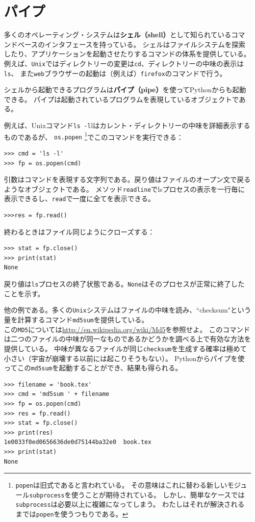 \documentclass[a4j,12pt,makeidx]{jbook}
\begin{document}
\section{パイプ}
多くのオペレーティング・システムは{\bf シェル（shell）}として知られているコマンドベースのインタフェースを持っている。
シェルはファイルシステムを探索したり、アプリケーションを起動させたりするコマンドの体系を提供している。
例えば、{\tt Unix}ではディレクトリーの変更は{\tt cd}、ディレクトリーの中味の表示は{\tt ls}、
また{\tt web}ブラウザーの起動は（例えば）{\tt firefox}のコマンドで行う。 \par
シェルから起動できるプログラムは{\bf パイプ（pipe）}を使ってPythonからも起動できる。
パイプは起動されているプログラムを表現しているオブジェクトである。\par
例えば、Unixコマンド{\tt ls -l}lはカレント・ディレクトリーの中味を詳細表示するものであるが、
{\tt os.popen}
\footnote{{\tt popen}は旧式であると言われている。
その意味はこれに替わる新しいモジュール{\tt subprocess}を使うことが期待されている。
しかし、簡単なケースでは{\tt subprocess}は必要以上に複雑になってしまう。
わたしはそれが解決されるまでは{\tt popen}を使うつもりである。}でこのコマンドを実行できる：
\begin{verbatim}
>>> cmd = 'ls -l'
>>> fp = os.popen(cmd)
\end{verbatim}
引数はコマンドを表現する文字列である。戻り値はファイルのオープン文で戻るようなオブジェクトである。
メソッド{\tt readline}でlsプロセスの表示を一行毎に表示できるし、{\tt read}で一度に全てを表示できる。
\begin{verbatim}
>>>res = fp.read()
\end{verbatim}
終わるときはファイル同じようにクローズする：
\begin{verbatim}
>>> stat = fp.close()
>>> print(stat)
None
\end{verbatim}
戻り値は{\tt ls}プロセスの終了状態である。{\tt None}はそのプロセスが正常に終了したことを示す。 \par
他の例である。多くの{\tt Unix}システムはファイルの中味を読み、``checksum"という量を計算するコマンド{\tt md5sum}を提供している。\\
この{\tt MD5}については\url{http://en.wikipedia.org/wiki/Md5}を参照せよ。
このコマンドは二つのファイルの中味が同一なものであるかどうかを調べる上で有効な方法を提供している。
中味が異なるファイルが同じ{\tt checksum}を生成する確率は極めて小さい（宇宙が崩壊する以前には起こりそうもない）。
Pythonからパイプを使ってこの{\tt md5sum}を起動することができ、結果も得られる。
\begin{verbatim}
>>> filename = 'book.tex'
>>> cmd = 'md5sum ' + filename
>>> fp = os.popen(cmd)
>>> res = fp.read()
>>> stat = fp.close()
>>> print(res)
1e0033f0ed0656636de0d75144ba32e0  book.tex
>>> print(stat)
None
\end{verbatim}
%
\end{document}
